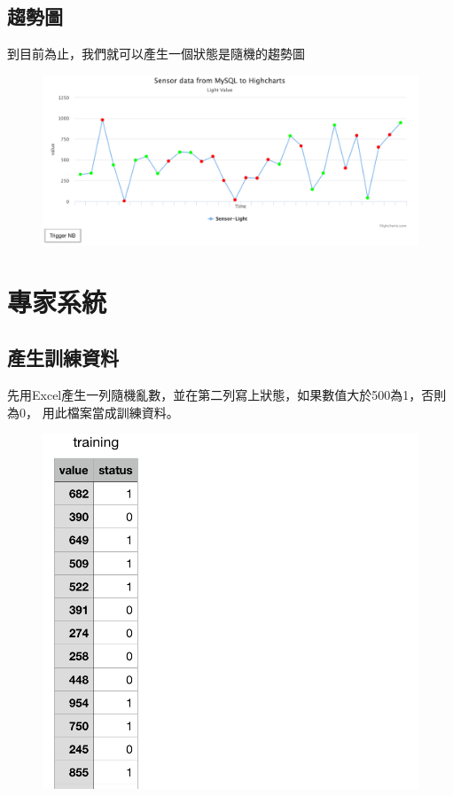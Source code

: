 \documentclass[12pt,a4paper]{article}
\begin{document}
{\subsection{趨勢圖}
{
到目前為止，我們就可以產生一個狀態是隨機的趨勢圖
\begin{figure}[ht]
\centering
\includegraphics[width=1.0\textwidth]{image/defaultcharts.png}
\end{figure}
}

\newpage
\section{專家系統}
{
\subsection{產生訓練資料}
先用Excel產生一列隨機亂數，並在第二列寫上狀態，如果數值大於500為1，否則為0，
用此檔案當成訓練資料。

\begin{figure}[ht]
\centering
\includegraphics[width=1.0\textwidth]{image/trainingData.png}
\end{figure}

}}
\end{document}
